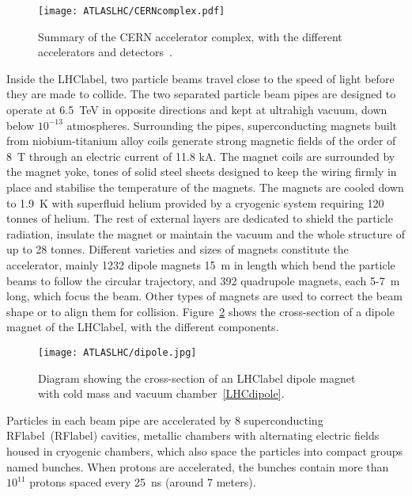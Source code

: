 \begin{figure}[htbp]
    \RawFloats
    \begin{center}
    \texttt{[image: ATLASLHC/CERNcomplex.pdf]}
    \caption{
        Summary of the CERN accelerator complex, with the different accelerators and detectors~\cite{CERNcomplex}. 
    }
    \label{figLHC:CERNcomplex}
    \end{center}
\end{figure}

Inside the \acrshort{LHClabel}, two particle beams travel close to the speed of light before they are made to collide. The two separated particle beam pipes are designed to operate at 6.5~TeV in opposite directions and kept at ultrahigh vacuum, down below $10^{-13}$ atmospheres. Surrounding the pipes, superconducting magnets built from niobium-titanium alloy coils generate strong magnetic fields of the order of 8~T through an electric current of 11.8 kA. The magnet coils are surrounded by the magnet yoke, tones of solid steel sheets designed to keep the wiring firmly in place and stabilise the temperature of the magnets. The magnets are cooled down to 1.9~K with superfluid helium provided by a cryogenic system requiring 120 tonnes of helium. The rest of external layers are dedicated to shield the particle radiation, insulate the magnet or maintain the vacuum and the whole structure of up to 28 tonnes. Different varieties and sizes of magnets constitute the accelerator, mainly 1232 dipole magnets 15~m in length which bend the particle beams to follow the circular trajectory, and 392 quadrupole magnets, each 5-7~m long, which focus the beam. Other types of magnets are used to correct the beam shape or to align them for collision. Figure~\ref{figLHC:dipole} shows the cross-section of a dipole magnet of the \acrshort{LHClabel}, with the different components.

\begin{figure}[htbp]
    \RawFloats
    \begin{center}
    \texttt{[image: ATLASLHC/dipole.jpg]}
    \caption{
        Diagram showing the cross-section of an \acrshort{LHClabel} dipole magnet with cold mass and vacuum chamber~\ref{LHCdipole}. 
    }
    \label{figLHC:dipole}
    \end{center}
\end{figure}

Particles in each beam pipe are accelerated by 8 superconducting \acrlong{RFlabel}~(\acrshort{RFlabel}) cavities, metallic chambers with alternating electric fields housed in cryogenic chambers, which also space the particles into compact groups named bunches. When protons are accelerated, the bunches contain more than $10^{11}$ protons spaced every 25~ns (around 7 meters).

